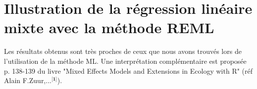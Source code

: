 \documentclass[11pt,fleqn]{book} %
\begin{document}
	\newpage
	
	\section{Illustration de la régression linéaire mixte avec la méthode REML }
	
	\vspace{2em}
	
	
	\vspace{4em}
	
	
	\vspace{2em}
	
	Les résultats obtenus sont très proches de ceux que nous avons trouvés lors de l'utilisation de la méthode ML. Une interprétation complémentaire est proposée p. 138-139 du livre "Mixed Effects Models and Extensions in Ecology with R" (réf Alain F.Zuur,...$^{\textbf{[1]}}$).
	
	
	
	
\end{document}
